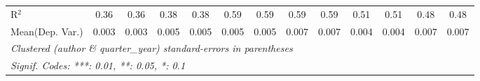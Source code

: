 \begin{tabular}{lcccccccccccc}
   R$^2$                                    & 0.36          & 0.36          & 0.38    & 0.38          & 0.59    & 0.59     & 0.59    & 0.59        & 0.51    & 0.51          & 0.48    & 0.48\\  
Mean(Dep. Var.) & 0.003 & 0.003 & 0.005 & 0.005 & 0.005 & 0.005 & 0.007 & 0.007 & 0.004 & 0.004 & 0.007 & 0.007 \\
   \midrule \midrule
   \multicolumn{13}{l}{\emph{Clustered (author \& quarter\_year) standard-errors in parentheses}}\\
   \multicolumn{13}{l}{\emph{Signif. Codes: ***: 0.01, **: 0.05, *: 0.1}}\\
\end{tabular}
\par\endgroup
